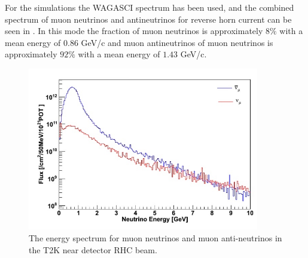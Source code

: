 For the simulations the WAGASCI spectrum has been used, and the combined spectrum of muon neutrinos and antineutrinos for reverse horn current can be seen in . In this mode the fraction of muon neutrinos is approximately $8\%$ with a mean energy of  $0.86$ GeV/c and muon antineutrinos of muon neutrinos is approximately $92\%$ with a mean energy of  $1.43$ GeV/c.



\begin{figure}[h!]
\centering
\includegraphics[width=0.9\textwidth]{figures/WAGASCIflux.jpeg}
\caption{The energy spectrum for muon neutrinos and muon anti-neutrinos in the T2K near detector RHC beam.}
\label{fig:T2KndSpectrum}
\end{figure}


